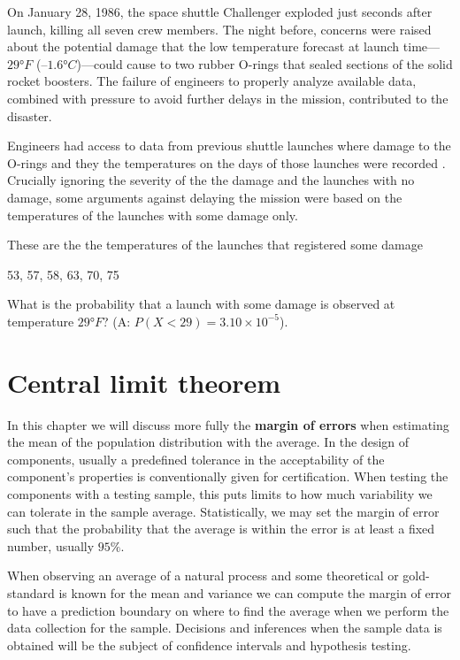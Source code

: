 \documentclass[
]{book}
\begin{document}
On January 28, 1986, the space shuttle Challenger exploded just seconds after launch, killing all seven crew members. The night before, concerns were raised about the potential damage that the low temperature forecast at launch time---\(29°F\) (\(–1.6°C\))---could cause to two rubber O-rings that sealed sections of the solid rocket boosters. The failure of engineers to properly analyze available data, combined with pressure to avoid further delays in the mission, contributed to the disaster.

Engineers had access to data from previous shuttle launches where damage to the O-rings and they the temperatures on the days of those launches were recorded \citep{tufte1997visual}. Crucially ignoring the severity of the the damage and the launches with no damage, some arguments against delaying the mission were based on the temperatures of the launches with some damage only.

These are the the temperatures of the launches that registered some damage

53, 57, 58, 63, 70, 75

What is the probability that a launch with some damage is observed at temperature \(29°F\)? (A: \(P(X< 29)=3.10\times 10^{-5}\)).

\hypertarget{central-limit-theorem}{%
\chapter{Central limit theorem}\label{central-limit-theorem}}

In this chapter we will discuss more fully the \textbf{margin of errors} when estimating the mean of the population distribution with the average. In the design of components, usually a predefined tolerance in the acceptability of the component's properties is conventionally given for certification. When testing the components with a testing sample, this puts limits to how much variability we can tolerate in the sample average. Statistically, we may set the margin of error such that the probability that the average is within the error is at least a fixed number, usually \(95\%\).

When observing an average of a natural process and some theoretical or gold-standard is known for the mean and variance we can compute the margin of error to have a prediction boundary on where to find the average when we perform the data collection for the sample. Decisions and inferences when the sample data is obtained will be the subject of confidence intervals and hypothesis testing.
\end{document}
